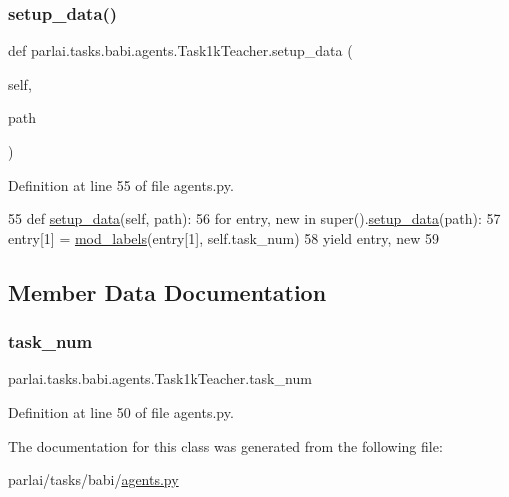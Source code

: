 \subsubsection{\texorpdfstring{setup\+\_\+data()}{setup\_data()}}
{\footnotesize\ttfamily def parlai.\+tasks.\+babi.\+agents.\+Task1k\+Teacher.\+setup\+\_\+data (\begin{DoxyParamCaption}\item[{}]{self,  }\item[{}]{path }\end{DoxyParamCaption})}



Definition at line 55 of file agents.\+py.


\begin{DoxyCode}
55     \textcolor{keyword}{def }\hyperlink{namespaceparlai_1_1tasks_1_1multinli_1_1agents_a4fa2cb0ba1ed745336ad8bceed36b841}{setup\_data}(self, path):
56         \textcolor{keywordflow}{for} entry, new \textcolor{keywordflow}{in} super().\hyperlink{namespaceparlai_1_1tasks_1_1multinli_1_1agents_a4fa2cb0ba1ed745336ad8bceed36b841}{setup\_data}(path):
57             entry[1] = \hyperlink{namespaceparlai_1_1tasks_1_1babi_1_1agents_a80ee701751bc608fcb01bcfb1e884de0}{mod\_labels}(entry[1], self.task\_num)
58             \textcolor{keywordflow}{yield} entry, new
59 
\end{DoxyCode}


\subsection{Member Data Documentation}
\mbox{\label{classparlai_1_1tasks_1_1babi_1_1agents_1_1Task1kTeacher_a0c153d5823837de445669016a18540e7}} 
\subsubsection{\texorpdfstring{task\+\_\+num}{task\_num}}
{\footnotesize\ttfamily parlai.\+tasks.\+babi.\+agents.\+Task1k\+Teacher.\+task\+\_\+num}



Definition at line 50 of file agents.\+py.



The documentation for this class was generated from the following file\+:\begin{DoxyCompactItemize}
\item 
parlai/tasks/babi/\hyperlink{parlai_2tasks_2babi_2agents_8py}{agents.\+py}\end{DoxyCompactItemize}
